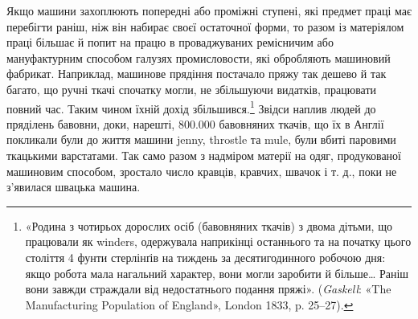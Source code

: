 Якщо машини захоплюють попередні або проміжні ступені,
які предмет праці має перебігти раніш, ніж він набирає своєї
остаточної форми, то разом із матеріялом праці більшає й попит
на працю в проваджуваних ремісничим або мануфактурним способом
галузях промисловости, які обробляють машиновий
фабрикат. Наприклад, машинове прядіння постачало пряжу так
дешево й так багато, що ручні ткачі спочатку могли, не збільшуючи
видатків, працювати повний час. Таким чином їхній дохід
збільшився.\footnote{
«Родина з чотирьох дорослих осіб (бавовняних ткачів) з двома
дітьми, що працювали як winders, одержувала наприкінці останнього та
на початку цього століття 4 фунти стерлінґів на тиждень за десятигодинного
робочою дня: якщо робота мала нагальний характер, вони могли
заробити й більше\dots{} Раніш вони завжди страждали від недостатнього
подання пряжі». (\emph{Gaskell}: «The Manufacturing Population of England»,
London 1833, p. 25--27).
} Звідси наплив людей до пряділень бавовни,
доки, нарешті, 800.000 бавовняних ткачів, що їх в Англії покликали
були до життя машини jenny, throstle та mule, були
вбиті паровими ткацькими варстатами. Так само разом з надміром
матерії на одяг, продукованої машиновим способом, зростало
число кравців, кравчих, швачок і т. д., поки не з’явилася
швацька машина.
